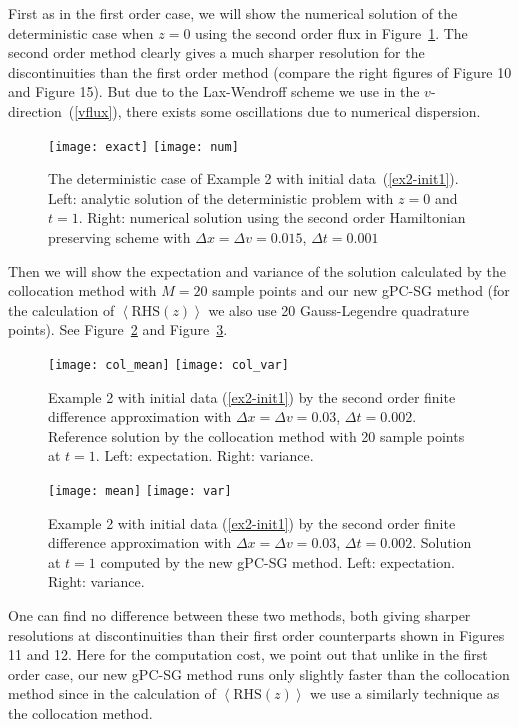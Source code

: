 \documentclass[12pt]{article}
\theoremstyle{plain}
\theoremstyle{remark}
\theoremstyle{remark}
\theoremstyle{remark}
\numberwithin{equation}{section}
\begin{document}
First as in the first order case, we will show the numerical solution of the deterministic case when $z=0$ using the second order flux in Figure~\ref{deter_sec}.  The second order method clearly gives a much sharper resolution for the discontinuities than the first order method (compare the right figures of
Figure 10 and Figure 15). But due to the Lax-Wendroff scheme we use in the $v$-direction~(\ref{vflux}), there exists some oscillations due to numerical dispersion.
\begin{figure}
  \texttt{[image: exact]}
  \texttt{[image: num]}
  \caption{The deterministic case of Example 2 with initial data~(\ref{ex2-init1}). Left: analytic solution of the deterministic problem with $z=0$ and $t=1$. Right: numerical solution using the second order Hamiltonian preserving scheme with $\Delta x = \Delta v = 0.015$, $\Delta t = 0.001$}
  \label{deter_sec}
\end{figure}

Then we will show the expectation and variance of the solution calculated by the collocation method with $M=20$ sample points and our new gPC-SG method (for the calculation of $\left<\mathrm{RHS}(z)\right>$ we also use 20 Gauss-Legendre quadrature points). See Figure~\ref{11} and Figure~\ref{12}.
\begin{figure}
  \texttt{[image: col\_mean]}
  \texttt{[image: col\_var]}
  \caption{Example 2 with initial data (\ref{ex2-init1}) by the second order 
finite difference approximation  with $\Delta x = \Delta v = 0.03$, $\Delta t = 0.002$. Reference solution 
 by the collocation method with 20 sample points at $t=1$. Left: expectation. Right: variance.}
  \label{11}
\end{figure}
\begin{figure}
  \texttt{[image: mean]}
  \texttt{[image: var]}
  \caption{Example 2 with initial data (\ref{ex2-init1}) by the second order 
finite difference approximation  with $\Delta x = \Delta v = 0.03$, $\Delta t = 0.002$. Solution at $t=1$ computed by the new gPC-SG method. Left: expectation. Right: variance.}
  \label{12}
\end{figure}
One can find no difference between these two methods, both giving sharper
resolutions at discontinuities than their first order counterparts shown in
Figures 11 and 12. Here for the computation cost, we point out that unlike in the first order case, our new gPC-SG method runs only slightly faster than the collocation method since in the calculation of $\left<\mathrm{RHS}(z)\right>$ we use a similarly technique as the collocation method.
\end{document}
